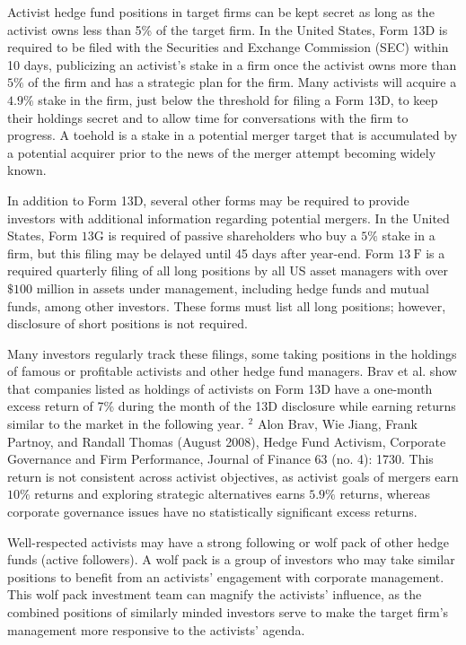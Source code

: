 \documentclass[11pt]{article}
\begin{document}
Activist hedge fund positions in target firms can be kept secret as long as the activist owns less than 5\% of the target firm. In the United States, Form 13D is required to be filed with the Securities and Exchange Commission (SEC) within 10 days, publicizing an activist's stake in a firm once the activist owns more than $5 \%$ of the firm and has a strategic plan for the firm. Many activists will acquire a $4.9 \%$ stake in the firm, just below the threshold for filing a Form 13D, to keep their holdings secret and to allow time for conversations with the firm to progress. A toehold is a stake in a potential merger target that is accumulated by a potential acquirer prior to the news of the merger attempt becoming widely known.

In addition to Form 13D, several other forms may be required to provide investors with additional information regarding potential mergers. In the United States, Form $13 \mathrm{G}$ is required of passive shareholders who buy a $5 \%$ stake in a firm, but this filing may be delayed until 45 days after year-end. Form $13 \mathrm{~F}$ is a required quarterly filing of all long positions by all US asset managers with over $\$ 100$ million in assets under management, including hedge funds and mutual funds, among other investors. These forms must list all long positions; however, disclosure of short positions is not required.

Many investors regularly track these filings, some taking positions in the holdings of famous or profitable activists and other hedge fund managers. Brav et al. show that companies listed as holdings of activists on Form 13D have a one-month excess return of 7\% during the month of the 13D disclosure while earning returns similar to the market in the following year. ${ }^{2}$ Alon Brav, Wie Jiang, Frank Partnoy, and Randall Thomas (August 2008), Hedge Fund Activism, Corporate Governance and Firm Performance, Journal of Finance 63 (no. 4): 1730. This return is not consistent across activist objectives, as activist goals of mergers earn $10 \%$ returns and exploring strategic alternatives earns $5.9 \%$ returns, whereas corporate governance issues have no statistically significant excess returns.

Well-respected activists may have a strong following or wolf pack of other hedge funds (active followers). A wolf pack is a group of investors who may take similar positions to benefit from an activists' engagement with corporate management. This wolf pack investment team can magnify the activists' influence, as the combined positions of similarly minded investors serve to make the target firm's management more responsive to the activists' agenda.
\end{document}

